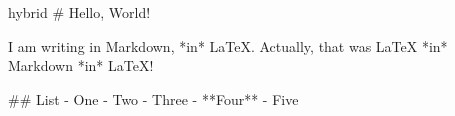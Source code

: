 \documentclass{article}
\begin{document}
\begin{markdown*}{hybrid}
# Hello, World!

I am writing in Markdown, *in* \LaTeX.
Actually, that was \LaTeX{} *in* Markdown *in* \LaTeX!

## List
- One
- Two
- Three
    - **Four**
    - Five
\end{markdown*}
\end{document}
